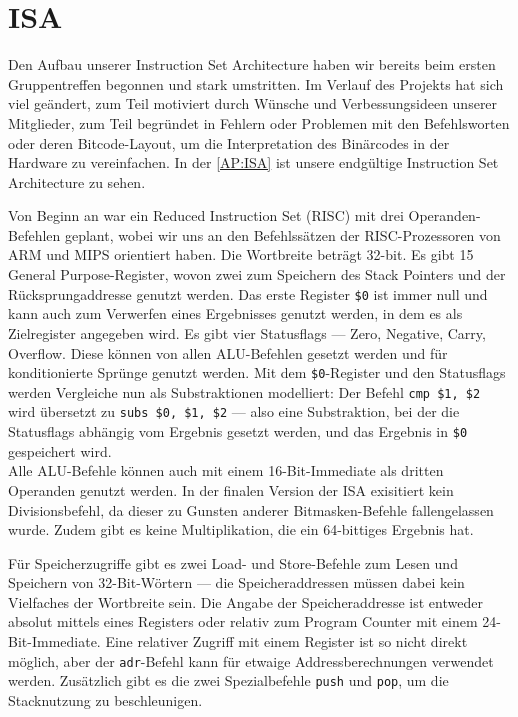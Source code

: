 \section{ISA}
Den Aufbau unserer Instruction Set Architecture haben wir bereits beim ersten Gruppentreffen begonnen und stark umstritten.
Im Verlauf des Projekts hat sich viel geändert, zum Teil motiviert durch Wünsche und Verbessungsideen unserer Mitglieder,
zum Teil begründet in Fehlern oder Problemen mit den Befehlsworten oder deren Bitcode-Layout, um die Interpretation des Binärcodes in der Hardware zu vereinfachen.
In der \autoref{AP:ISA} ist unsere endgültige Instruction Set Architecture zu sehen.

Von Beginn an war ein Reduced Instruction Set (RISC) mit drei Operanden-Befehlen geplant,
wobei wir uns an den Befehlssätzen der RISC-Prozessoren von ARM und MIPS orientiert haben.
Die Wortbreite beträgt 32-bit. Es gibt 15 General Purpose-Register, wovon zwei zum Speichern des Stack Pointers und der Rücksprungaddresse genutzt werden.
Das erste Register \texttt{\$0} ist immer null und kann auch zum Verwerfen eines Ergebnisses genutzt werden, in dem es als Zielregister angegeben wird.
Es gibt vier Statusflags --- Zero, Negative, Carry, Overflow.
Diese können von allen ALU-Befehlen gesetzt werden und für konditionierte Sprünge genutzt werden.
Mit dem \texttt{\$0}-Register und den Statusflags werden Vergleiche nun als Substraktionen modelliert:
Der Befehl \texttt{cmp \$1, \$2} wird übersetzt zu \texttt{subs \$0, \$1, \$2} ---
also eine Substraktion, bei der die Statusflags abhängig vom Ergebnis gesetzt werden, und das Ergebnis in \texttt{\$0} gespeichert wird. \\
Alle ALU-Befehle können auch mit einem 16-Bit-Immediate als dritten Operanden genutzt werden.
In der finalen Version der ISA exisitiert kein Divisionsbefehl, da dieser zu Gunsten anderer Bitmasken-Befehle fallengelassen wurde.
Zudem gibt es keine Multiplikation, die ein 64-bittiges Ergebnis hat.

Für Speicherzugriffe gibt es zwei Load- und Store-Befehle zum Lesen und Speichern von 32-Bit-Wörtern ---
die Speicheraddressen müssen dabei kein Vielfaches der Wortbreite sein.
Die Angabe der Speicheraddresse ist entweder absolut mittels eines Registers oder relativ zum Program Counter mit einem 24-Bit-Immediate.
Eine relativer Zugriff mit einem Register ist so nicht direkt möglich, aber der \texttt{adr}-Befehl kann für etwaige Addressberechnungen verwendet werden.
Zusätzlich gibt es die zwei Spezialbefehle \texttt{push} und \texttt{pop}, um die Stacknutzung zu beschleunigen.

